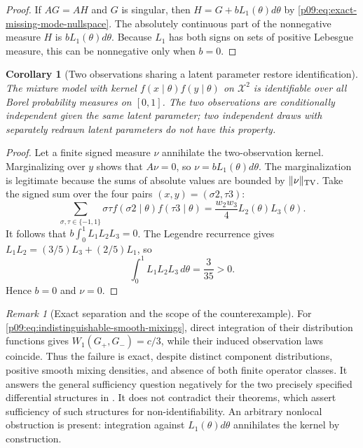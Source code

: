 \documentclass[11pt,letterpaper]{article}
\newtheorem{corollary}[theorem]{Corollary}
\theoremstyle{definition}
\theoremstyle{remark}
\newtheorem{remark}[theorem]{Remark}
\newcommand{\1}{\mathbf 1}
\begin{document}
\begin{proof}
If $AG=AH$ and $G$ is singular, then
$H=G+bL_1(\theta)d\theta$ by
\eqref{p09:eq:exact-missing-mode-nullspace}.  The absolutely continuous part
of the nonnegative measure $H$ is $bL_1(\theta)d\theta$.
Because $L_1$ has both signs on sets of positive Lebesgue measure, this
can be nonnegative only when $b=0$.
\end{proof}

\begin{corollary}[Two observations sharing a latent parameter restore identification]
\label{p09:cor:two-replicate-repair}
The mixture model with kernel
$f(x\mid\theta)f(y\mid\theta)$ on $\mathcal X^2$ is identifiable
over all Borel probability measures on $[0,1]$.
The two observations are conditionally independent given the same
latent parameter; two independent draws with separately redrawn
latent parameters do not have this property.
\end{corollary}

\begin{proof}
Let a finite signed measure $\nu$ annihilate the two-observation kernel.
Marginalizing over $y$ shows that $A\nu=0$, so
$\nu=bL_1(\theta)d\theta$.  The marginalization is legitimate because
the sums of absolute values are bounded by $\|\nu\|_{\rm TV}$.
Take the signed sum over the four pairs $(x,y)=(\sigma2,\tau3)$:
\[
 \sum_{\sigma,\tau\in\{-1,1\}}\sigma\tau
    f(\sigma2\mid\theta)f(\tau3\mid\theta)
       =\frac{w_2w_3}{4}L_2(\theta)L_3(\theta).
\]
It follows that $b\int_0^1L_1L_2L_3=0$.
The Legendre recurrence gives
$L_1L_2=(3/5)L_3+(2/5)L_1$, so
\[
 \int_0^1 L_1L_2L_3\,d\theta=\frac{3}{35}>0.
\]
Hence $b=0$ and $\nu=0$.
\end{proof}

\begin{remark}[Exact separation and the scope of the counterexample]
For \eqref{p09:eq:indistinguishable-smooth-mixings}, direct integration of
their distribution functions gives
$W_1(G_+,G_-)=c/3$, while their induced observation laws coincide.
Thus the failure is exact, despite distinct component distributions,
positive smooth mixing densities, and absence of both finite operator
classes.  It answers the general sufficiency question negatively for
the two precisely specified differential structures in
\cite{LeBarilettoRinaldoHo2026}.  It does not contradict their theorems,
which assert sufficiency of such structures for non-identifiability.
An arbitrary nonlocal obstruction is present: integration against
$L_1(\theta)d\theta$ annihilates the kernel by construction.
\end{remark}
\end{document}
